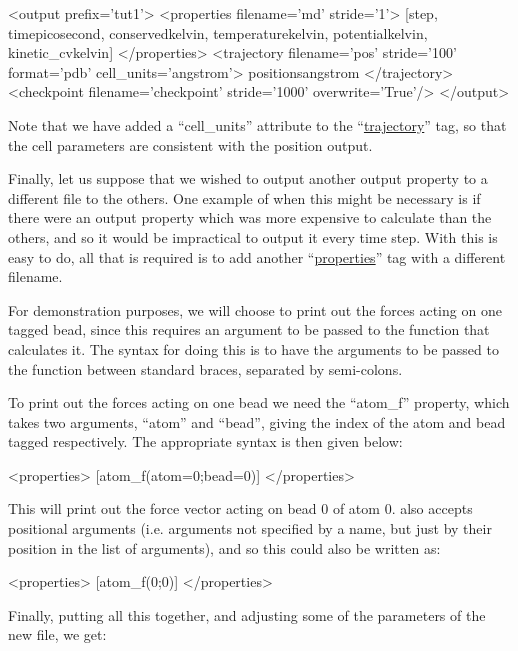 \documentclass[11pt,english,fleqn]{report}
\newenvironment{code}{%
\footnotesize 
\verbatim
}{
\endverbatim
\normalsize
}
\begin{document}
\begin{code}
<output prefix='tut1'>
   <properties filename='md' stride='1'>
      [step, time{picosecond}, conserved{kelvin}, 
       temperature{kelvin}, potential{kelvin}, kinetic_cv{kelvin}] 
   </properties>
   <trajectory filename='pos' stride='100' format='pdb' cell_units='angstrom'>
      positions{angstrom} 
   </trajectory>
   <checkpoint filename='checkpoint' stride='1000' overwrite='True'/>
</output>
\end{code}

Note that we have added a {}``cell\_units'' attribute
to the {}``\hyperref[TRAJECTORY]{trajectory}'' tag, so that the
cell parameters are consistent with the position output.

Finally, let us suppose that we wished to output another output property
to a different file to the others. One example of when this 
might be necessary is if there
were an output property which was more expensive to calculate than the
others, and so it would be impractical to output it every time step.
With \ipi this is easy to do, all that is required is to add another
{}``\hyperref[PROPERTIES]{properties}'' tag with a different filename.

For demonstration purposes, we will choose to print out the forces
acting on one tagged bead, since this requires an argument to be
passed to the function that calculates it. The \ipi syntax for doing this is to have
the arguments to be passed to the function between standard braces,
separated by semi-colons.

To print out the forces acting on one bead we need the {}``atom\_f''
property, which takes two arguments, {}``atom'' and {}``bead'',
giving the index of the atom and bead tagged respectively. The
appropriate syntax is then given below:

\begin{code}
<properties> 
   [atom_f(atom=0;bead=0)] 
</properties>
\end{code}

This will print out the force vector acting on bead 0 of atom 0.
\ipi also accepts positional arguments
(i.e. arguments not specified by a name, but just by their position
in the list of arguments), and so this could also be written as:

\begin{code}
<properties> 
   [atom_f(0;0)] 
</properties>
\end{code}

Finally, putting all this together, and adjusting some
of the parameters of the new file, we get:
\end{document}
